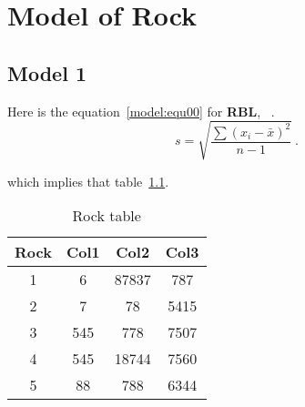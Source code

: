 %
%
\chapter{Model of Rock}
\hskip 0.5in

\section{Model 1}

Here is the equation~\ref{model:equ00} for {\bf RBL}, {\ie} {\rbl}~\cite{Smith2010}. 
\begin{equation}
 s = \sqrt{\frac{ \sum (x_{i} - \bar{x})^2}{n - 1}}  \label{model:equ00} ~ .  
\end{equation}

which implies that table~\ref{model:table00}.

\begin{table}[h!]
\centering
 \begin{tabular}{||c c c c||} 
 \hline
 Rock & Col1 & Col2 & Col3 \\ [0.5ex] 
 \hline\hline
 1 & 6 & 87837 & 787 \\ 
 2 & 7 & 78 & 5415 \\
 3 & 545 & 778 & 7507 \\
 4 & 545 & 18744 & 7560 \\
 5 & 88 & 788 & 6344 \\ [1ex] 
 \hline
 \end{tabular}
\caption{Rock table}
\label{model:table00}
\end{table}

